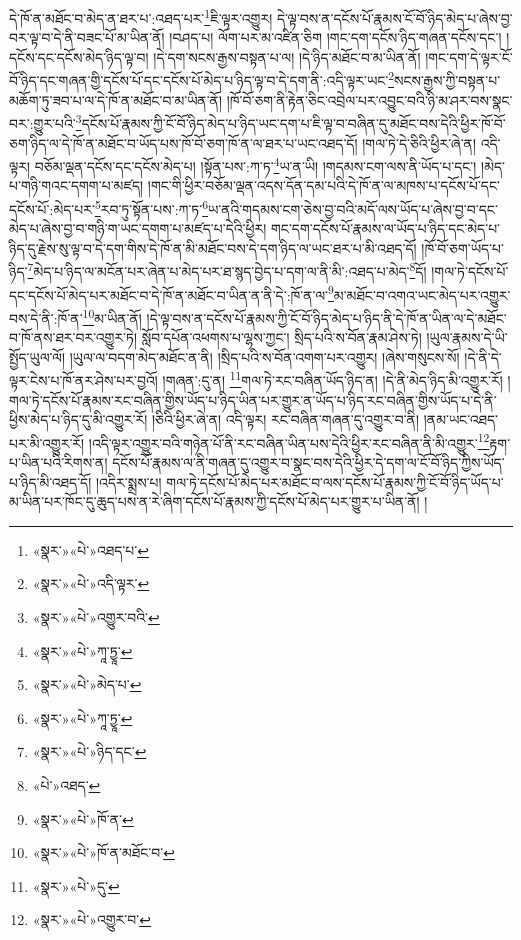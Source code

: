 དེ་ཁོ་ན་མཐོང་བ་མེད་ན་ཐར་པ་:འཐད་པར་\footnote{«སྣར་»«པེ་»འཐད་པ་}ཇི་ལྟར་འགྱུར། དེ་ལྟ་བས་ན་དངོས་པོ་རྣམས་ངོ་བོ་ཉིད་མེད་པ་ཞེས་བྱ་བར་ལྟ་བ་དེ་ནི་བཟང་པོ་མ་ཡིན་ནོ། །བཤད་པ། ལོག་པར་མ་འཛིན་ཅིག །གང་དག་དངོས་ཉིད་གཞན་དངོས་དང་། །དངོས་དང་དངོས་མེད་ཉིད་ལྟ་བ། །དེ་དག་སངས་རྒྱས་བསྟན་པ་ལ། །དེ་ཉིད་མཐོང་བ་མ་ཡིན་ནོ། །གང་དག་དེ་ལྟར་ངོ་བོ་ཉིད་དང་གཞན་གྱི་དངོས་པོ་དང་དངོས་པོ་མེད་པ་ཉིད་ལྟ་བ་དེ་དག་ནི་:འདི་ལྟར་ཡང་\footnote{«སྣར་»«པེ་»འདི་ལྟར་}སངས་རྒྱས་ཀྱི་བསྟན་པ་མཆོག་ཏུ་ཟབ་པ་ལ་དེ་ཁོ་ན་མཐོང་བ་མ་ཡིན་ནོ། །ཁོ་བོ་ཅག་ནི་རྟེན་ཅིང་འབྲེལ་པར་འབྱུང་བའི་ཉི་མ་ཤར་བས་སྣང་བར་:གྱུར་པའི་\footnote{«སྣར་»«པེ་»འགྱུར་བའི་}དངོས་པོ་རྣམས་ཀྱི་ངོ་བོ་ཉིད་མེད་པ་ཉིད་ཡང་དག་པ་ཇི་ལྟ་བ་བཞིན་དུ་མཐོང་བས་དེའི་ཕྱིར་ཁོ་བོ་ཅག་ཉིད་ལ་དེ་ཁོ་ན་མཐོང་བ་ཡོད་པས་ཁོ་བོ་ཅག་ཁོ་ན་ལ་ཐར་པ་ཡང་འཐད་དོ། །གལ་ཏེ་དེ་ཅིའི་ཕྱིར་ཞེ་ན། འདི་ལྟར། བཅོམ་ལྡན་དངོས་དང་དངོས་མེད་པ། །སྟོན་པས་:ཀ་ཏ་\footnote{«སྣར་»«པེ་»ཀཱ་ཏྱཱ་}ཡ་ན་ཡི། །གདམས་ངག་ལས་ནི་ཡོད་པ་དང་། །མེད་པ་གཉི་གའང་དགག་པ་མཛད། །གང་གི་ཕྱིར་བཅོམ་ལྡན་འདས་དོན་དམ་པའི་དེ་ཁོ་ན་ལ་མཁས་པ་དངོས་པོ་དང་དངོས་པོ་:མེད་པར་\footnote{«སྣར་»«པེ་»མེད་པ་}རབ་ཏུ་སྟོན་པས་:ཀ་ཏ་\footnote{«སྣར་»«པེ་»ཀཱ་ཏྱཱ་}ཡ་ནའི་གདམས་ངག་ཅེས་བྱ་བའི་མདོ་ལས་ཡོད་པ་ཞེས་བྱ་བ་དང་མེད་པ་ཞེས་བྱ་བ་གཉི་ག་ཡང་དགག་པ་མཛད་པ་དེའི་ཕྱིར། གང་དག་དངོས་པོ་རྣམས་ལ་ཡོད་པ་ཉིད་དང་མེད་པ་ཉིད་དུ་རྗེས་སུ་ལྟ་བ་དེ་དག་གིས་དེ་ཁོ་ན་མི་མཐོང་བས་དེ་དག་ཉིད་ལ་ཡང་ཐར་པ་མི་འཐད་དོ། །ཁོ་བོ་ཅག་ཡོད་པ་ཉིད་\footnote{«སྣར་»«པེ་»ཉིད་དང་}མེད་པ་ཉིད་ལ་མངོན་པར་ཞེན་པ་མེད་པར་ཐ་སྙད་བྱེད་པ་དག་ལ་ནི་མི་:འཐད་པ་མེད་\footnote{«པེ་»འཐད་}དོ། །གལ་ཏེ་དངོས་པོ་དང་དངོས་པོ་མེད་པར་མཐོང་བ་དེ་ཁོ་ན་མཐོང་བ་ཡིན་ན་ནི་དེ་:ཁོ་ན་ལ་\footnote{«སྣར་»«པེ་»ཁོ་ན་}མ་མཐོང་བ་འགའ་ཡང་མེད་པར་འགྱུར་བས་དེ་ནི་:ཁོ་ན་\footnote{«སྣར་»«པེ་»ཁོ་ན་མཐོང་བ་}མ་ཡིན་ནོ། །དེ་ལྟ་བས་ན་དངོས་པོ་རྣམས་ཀྱི་ངོ་བོ་ཉིད་མེད་པ་ཉིད་ནི་དེ་ཁོ་ན་ཡིན་ལ་དེ་མཐོང་བ་ཁོ་ནས་ཐར་བར་འགྱུར་ཏེ། སློབ་དཔོན་འཕགས་པ་ལྷས་ཀྱང་། སྲིད་པའི་ས་བོན་རྣམ་ཤེས་ཏེ། །ཡུལ་རྣམས་དེ་ཡི་སྤྱོད་ཡུལ་ལོ། །ཡུལ་ལ་བདག་མེད་མཐོང་ན་ནི། །སྲིད་པའི་ས་བོན་འགག་པར་འགྱུར། །ཞེས་གསུངས་སོ། །དེ་ནི་དེ་ལྟར་ངེས་པ་ཁོ་ནར་ཤེས་པར་བྱའོ། །གཞན་:དུ་ན། \footnote{«སྣར་»«པེ་»དུ་}གལ་ཏེ་རང་བཞིན་ཡོད་ཉིད་ན། །དེ་ནི་མེད་ཉིད་མི་འགྱུར་རོ། །གལ་ཏེ་དངོས་པོ་རྣམས་རང་བཞིན་གྱིས་ཡོད་པ་ཉིད་ཡིན་པར་གྱུར་ན་ཡོད་པ་ཉིད་རང་བཞིན་གྱིས་ཡོད་པ་དེ་ནི་ཕྱིས་མེད་པ་ཉིད་དུ་མི་འགྱུར་རོ། །ཅིའི་ཕྱིར་ཞེ་ན། འདི་ལྟར། རང་བཞིན་གཞན་དུ་འགྱུར་བ་ནི། །ནམ་ཡང་འཐད་པར་མི་འགྱུར་རོ། །འདི་ལྟར་འགྱུར་བའི་གཉེན་པོ་ནི་རང་བཞིན་ཡིན་པས་དེའི་ཕྱིར་རང་བཞིན་ནི་མི་འགྱུར་\footnote{«སྣར་»«པེ་»འགྱུར་བ་}རྟག་པ་ཡིན་པའི་རིགས་ན། དངོས་པོ་རྣམས་ལ་ནི་གཞན་དུ་འགྱུར་བ་སྣང་བས་དེའི་ཕྱིར་དེ་དག་ལ་ངོ་བོ་ཉིད་ཀྱིས་ཡོད་པ་ཉིད་མི་འཐད་དོ། །འདིར་སྨྲས་པ། གལ་ཏེ་དངོས་པོ་མེད་པར་མཐོང་བ་ལས་དངོས་པོ་རྣམས་ཀྱི་ངོ་བོ་ཉིད་ཡོད་པ་མ་ཡིན་པར་ཁོང་དུ་ཆུད་པས་ན་རེ་ཞིག་དངོས་པོ་རྣམས་ཀྱི་དངོས་པོ་མེད་པར་གྱུར་པ་ཡིན་ནོ། །
